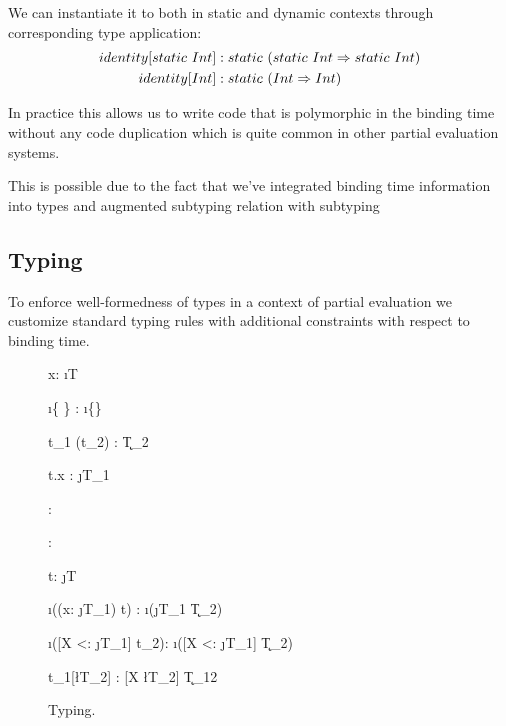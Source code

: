 We can instantiate it to both in static and dynamic contexts through corresponding
type application:
\begin{align}\nonumber
  identity[static\ Int] &: static\ (static\ Int \Rightarrow static\ Int) \\
  identity[Int]          &: static\ (Int \Rightarrow Int)
\end{align}

In practice this allows us to write code that is polymorphic in the binding time without
any code duplication which is quite common in other partial evaluation systems.

This is possible due to the fact that we've integrated binding time information into types
and augmented subtyping relation with subtyping

\subsection{Typing}

To enforce well-formedness of types in a context of partial evaluation we customize
standard typing rules with additional constraints with respect to binding time.

\begin{figure}[H]
  {\Gamma \ts x: \i{T}}

  {\Gamma \ts \i{\{  \}} : \i{\{\}}}

  {\Gamma \ts t_1 (t_2) : \k{T_2}}

  {\Gamma \ts t.x : \j{T_1}}

  {\Gamma \ts {}: }

  {\Gamma \ts {}: }

  {\Gamma \ts t: \j{T}}

  {\Gamma \ts \i{((x: \j{T_1}) \ra t)} : \i{(\j{T_1} \ra \k{T_2})}}

  {\Gamma \ts \i([X <: \j{T_1}] \ra t_2): \i{([X <: \j{T_1}] \ra \k{T_2})}}

  {\Gamma \ts t_1[\l{T_2}] : [X \mapsto \l{T_2}] \k{T_{12}}}
\caption{Typing.}
\end{figure}

